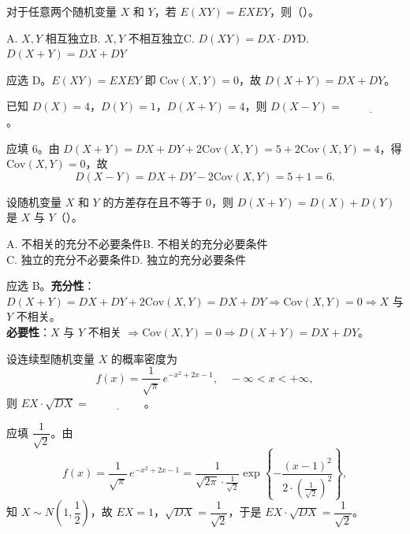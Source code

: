 \documentclass[lang=cn,11pt]{elegantbook}
\begin{document}
\begin{exercise}\label{exer:4-8-exye}
对于任意两个随机变量 \(X\) 和 \(Y\)，若 \(E(XY) = EXEY\)，则（\quad）。\par
A. \(X,Y\) 相互独立\quad B. \(X,Y\) 不相互独立\quad C. \(D(XY) = DX \cdot DY\)\quad D. \(D(X+Y) = DX + DY\)
\end{exercise}
\begin{solution}
应选 D。\(E(XY) = EXEY\) 即 \(\mathrm{Cov}(X,Y) = 0\)，故 \(D(X+Y) = DX + DY\)。
\end{solution}

\begin{exercise}\label{exer:4-9-dxy}
已知 \(D(X) = 4\)，\(D(Y) = 1\)，\(D(X+Y) = 4\)，则 \(D(X-Y) =\,\underline{\hspace{2cm}}\)。
\end{exercise}
\begin{solution}
应填 6。由 \(D(X+Y) = DX + DY + 2\mathrm{Cov}(X,Y) = 5 + 2\mathrm{Cov}(X,Y) = 4\)，得 \(\mathrm{Cov}(X,Y) = 0\)，故
\[
D(X-Y) = DX + DY - 2\mathrm{Cov}(X,Y) = 5 + 1 = 6.
\]
\end{solution}

\begin{exercise}\label{exer:4-10-suff}
设随机变量 \(X\) 和 \(Y\) 的方差存在且不等于 0，则 \(D(X+Y) = D(X) + D(Y)\) 是 $X$ 与 $Y$（\quad）。\par
A. 不相关的充分不必要条件\quad B. 不相关的充分必要条件\quad\\
C. 独立的充分不必要条件\quad D. 独立的充分必要条件
\end{exercise}
\begin{solution}
应选 B。\textbf{充分性}：\(D(X+Y) = DX + DY + 2\mathrm{Cov}(X,Y) = DX + DY \Rightarrow \mathrm{Cov}(X,Y) = 0 \Rightarrow X\) 与 \(Y\) 不相关。\\
\textbf{必要性}：$X$ 与 \(Y\) 不相关 \(\Rightarrow \mathrm{Cov}(X,Y) = 0 \Rightarrow D(X+Y) = DX + DY\)。
\end{solution}


\begin{exercise}\label{exer:4-4-normal}
设连续型随机变量 \(X\) 的概率密度为
\[
f(x) = \frac{1}{\sqrt{\pi}}\,e^{-x^2 + 2x - 1}, \quad -\infty < x < +\infty,
\]
则 \(EX \cdot \sqrt{DX} =\,\underline{\hspace{2cm}}\)。
\end{exercise}
\begin{solution}
应填 \(\dfrac{1}{\sqrt{2}}\)。由
\[
f(x) = \frac{1}{\sqrt{\pi}}\,e^{-x^2+2x-1} = \frac{1}{\sqrt{2\pi}\cdot\frac{1}{\sqrt{2}}}\exp\!\left\{-\frac{(x-1)^2}{2\cdot\left(\frac{1}{\sqrt{2}}\right)^2}\right\},
\]
知 \(X \sim N\!\left(1,\dfrac{1}{2}\right)\)，故 \(EX = 1\)，\(\sqrt{DX} = \dfrac{1}{\sqrt{2}}\)，于是 \(EX \cdot \sqrt{DX} = \dfrac{1}{\sqrt{2}}\)。
\end{solution}
\end{document}
